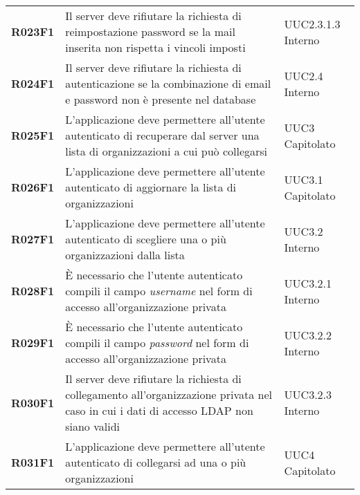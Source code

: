 \documentclass[../analisi-dei-requisiti.tex]{subfiles}
\begin{document}
\begin{longtable}[H]{>{\centering\bfseries}m{3cm} >{\centering}m{10cm} >{\centering\arraybackslash}m{3cm}}
  R023F1                               & Il server deve rifiutare la richiesta di reimpostazione password se la mail inserita non rispetta i vincoli imposti                                                                                     & UUC2.3.1.3 Interno            \\
  R024F1                               & Il server deve rifiutare la richiesta di autenticazione se la combinazione di email e password non è presente nel database                                                                              & UUC2.4 Interno                \\

  R025F1                               & L'applicazione deve permettere all'utente autenticato di recuperare dal server una lista di organizzazioni a cui può collegarsi                                                                         & UUC3 Capitolato               \\
  R026F1                               & L'applicazione deve permettere all'utente autenticato di aggiornare la lista di organizzazioni                                                                                                          & UUC3.1 Capitolato             \\
  R027F1                               & L'applicazione deve permettere all'utente autenticato di scegliere una o più organizzazioni dalla lista                                                                                                 & UUC3.2 Interno                \\
  R028F1                               & È necessario che l'utente autenticato compili il campo \textit{username} nel form di accesso all'organizzazione privata                                                                                 & UUC3.2.1 Interno              \\
  R029F1                               & È necessario che l'utente autenticato compili il campo \textit{password} nel form di accesso all'organizzazione privata                                                                                 & UUC3.2.2 Interno              \\
  R030F1                               & Il server deve rifiutare la richiesta di collegamento all'organizzazione privata nel caso in cui i dati di accesso LDAP non siano validi                                                                & UUC3.2.3 Interno              \\
  R031F1                               & L'applicazione deve permettere all'utente autenticato di collegarsi ad una o più organizzazioni                                                                                                         & UUC4 Capitolato               \\

\end{longtable}
\end{document}
